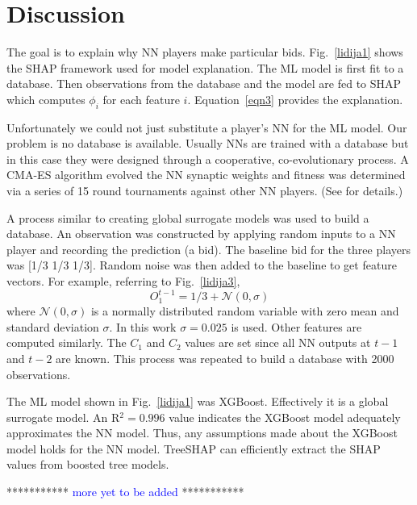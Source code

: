 \documentclass[journal]{IEEEtran} %
\begin{document}
\section{Discussion}

The goal is to explain why NN players make particular bids. Fig.~\ref{lidija1} shows the SHAP framework used for model explanation. The ML model is first fit to a database. Then observations from the database and the model are fed to SHAP which computes $\phi_i$ for each feature $i$. Equation~\eqref{eqn3} provides the explanation. 

Unfortunately we could not just substitute a player's NN for the ML model.  Our problem is no database is available. Usually NNs are trained with a database but in this case they were designed through a cooperative, co-evolutionary process. A CMA-ES algorithm evolved the NN synaptic weights and fitness was determined via a series of 15 round tournaments against other NN players. (See \cite{gree2} for details.) 

A process similar to creating global surrogate models was used to build a database.
An observation was constructed by applying random inputs to a NN player and recording the prediction (a bid). The baseline bid for the three players was [1/3 1/3 1/3]. Random noise was then added to the baseline to get feature vectors. For example, referring to Fig.~\ref{lidija3}, 
\[
O_1^{t-1} = 1/3 + \mathcal{N}(0,\sigma)
\]
\noindent where $\mathcal{N}(0,\sigma)$ is a normally distributed random variable with zero mean and standard deviation $\sigma$. In this work $\sigma=0.025$ is used. Other features are computed similarly. The $C_1$ and $C_2$ values are set since all NN outputs at $t-1$ and $t-2$ are known. This process was repeated to build a database with 2000 observations.

The ML model shown in Fig.~\ref{lidija1} was XGBoost. Effectively it is a global surrogate model. An R$^2=0.996$ value indicates the XGBoost model adequately approximates the NN model. Thus, any assumptions made about the XGBoost model holds for the NN model. TreeSHAP can efficiently extract the SHAP values from boosted tree models. 

\vspace{0.2cm}
***********
\textcolor{blue}{more yet to be added}
***********
\end{document}
